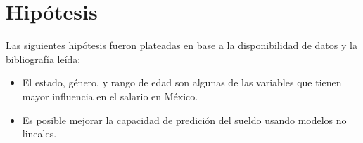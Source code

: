 \newpage
\section{Hip\'otesis}
Las siguientes hip\'otesis fueron plateadas en base a la disponibilidad de datos y la bibliograf\'ia le\'ida:
\begin{itemize}
    \item El estado, g\'enero, y rango de edad son algunas de las variables que tienen mayor influencia en el salario  en M\'exico.
    \item Es posible mejorar la capacidad de predici\'on del sueldo usando modelos no lineales.
\end{itemize}





